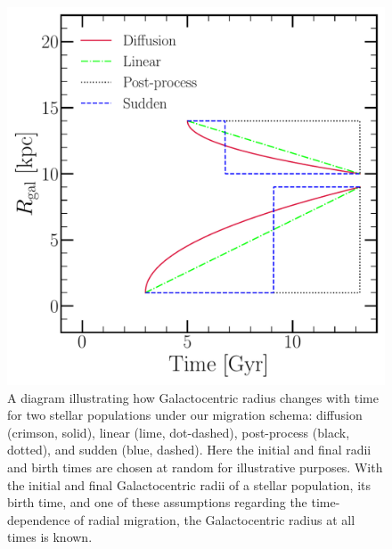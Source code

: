 \documentclass[fleqn, usenatbib]{mnras}
\begin{document}
\begin{figure} 
\centering 
\includegraphics[scale = 0.45]{migration.pdf} 
\caption{A diagram illustrating how Galactocentric radius changes with time for 
two stellar populations under our migration schema: diffusion (crimson, solid), 
linear (lime, dot-dashed), post-process (black, dotted), and sudden (blue, 
dashed). Here the initial and final radii and birth times are chosen at random 
for illustrative purposes. With the initial and final Galactocentric radii of 
a stellar population, its birth time, and one of these assumptions regarding 
the time-dependence of radial migration, the Galactocentric radius at all times 
is known. } 
\label{fig:migration_schema} 
\end{figure} 
\end{document}
